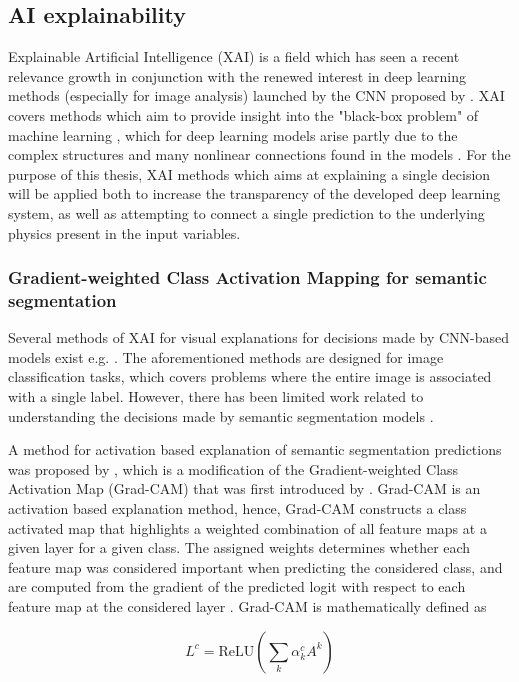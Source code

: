 \documentclass[../main/thesis.tex]{subfiles}
\begin{document}
\subsection{AI explainability}
Explainable Artificial Intelligence (XAI) is a field which has seen a recent relevance growth in conjunction with the renewed interest in deep learning methods (especially for image analysis) launched by the CNN proposed by \citet{Krizhevsky2012}. XAI covers methods which aim to provide insight into the "black-box problem" of machine learning \citep{Adadi2018}, which for deep learning models arise partly due to the complex structures and many nonlinear connections found in the models \citep{Lopes2022}. For the purpose of this thesis, XAI methods which aims at explaining a single decision will be applied both to increase the transparency of the developed deep learning system, as well as attempting to connect a single prediction to the underlying physics present in the input variables.

\subsubsection{Gradient-weighted Class Activation Mapping for semantic segmentation}
\label{sec:seg-grad-cam}
Several methods of XAI for visual explanations for decisions made by CNN-based models exist e.g. \citep{Simonyan2013,Zhou2016,Selvaraju2016,Sundararajan2017,Lundberg2017}. The aforementioned methods are designed for image classification tasks, which covers problems where the entire image is associated with a single label. However, there has been limited work related to understanding the decisions made by semantic segmentation models \citep{Linardatos2020}.

A method for activation based explanation of semantic segmentation predictions was proposed by \citet{Vinogradova2020}, which is a modification of the Gradient-weighted Class Activation Map (Grad-CAM) that was first introduced by \citet{Selvaraju2016}. Grad-CAM is an activation based explanation method, hence, Grad-CAM constructs a class activated map that highlights a weighted combination of all feature maps at a given layer for a given class. The assigned weights determines whether each feature map was considered important when predicting the considered class, and are computed from the gradient of the predicted logit with respect to each feature map at the considered layer \citep{Selvaraju2016}. Grad-CAM is mathematically defined as

\begin{equation}
    \label{eq:gradcam}
    L^c = \text{ReLU}\left(\sum_k \alpha_k^c A^k\right)    
\end{equation}
\end{document}

